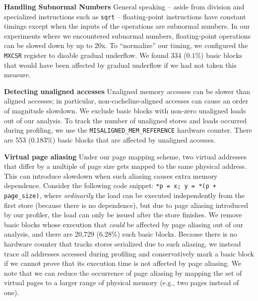 \textbf{Handling Subnormal Numbers}
General speaking -- aside from division
and specialized instructions such as \verb|sqrt|
-- floating-point instructions have constant timings
except when the inputs of the operations are subnormal numbers.
In our experiments where we encountered subnormal numbers,
floating-point operations can be slowed down by up to 20x.
To ``normalize'' our timing, we configured the \verb|MXCSR| register
to disable gradual underflow.
We found 334 ($0.1\%$) basic blocks that would have been affected by 
gradual underflow if we had not taken this measure.

\textbf{Detecting unaligned accesses}
Unaligned memory accesses can be slower than aligned accesses; in particular,
non-cacheline-aligned accesses can cause
an order of magnitude slowdown.
We exclude basic blocks with non-zero unaligned loads out of our analysis.
To track the number of unaligned stores and loads occurred during profiling,
we use the 
\verb|MISALIGNED_MEM_REFERENCE| hardware counter.
There are 553 (0.183\%) basic blocks that are affected by unaligned accesses.

\textbf{Virtual page aliasing}
Under our page mapping scheme,
two virtual addresses that differ by a multiple of page size gets mapped to
the same physical address. This can introduce slowdown when such aliasing causes
extra memory dependence. Consider the following code snippet: \verb|*p = x; y = *(p + page_size)|, where
\textit{ordinarily} the load can be executed independently from the first store 
(because there is no dependence),
but due to page aliasing introduced by our profiler, the load can only be issued
after the store finishes.
We remove basic blocks whose execution that \textit{could} be affected by
page aliasing out of our analysis,
and there are 20,729 (6.28\%) such basic blocks.
Because there is no hardware counter that tracks stores serialized due
to such aliasing, we instead trace all addresses accessed during profiling and
conservatively mark a basic block if we cannot prove that its execution time is not
affected by page aliasing.
We note that we can reduce the occurrence of page aliasing by mapping the set of virtual
pages to a larger range of physical memory (e.g., two pages instead of one).

